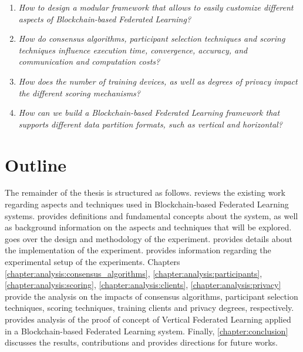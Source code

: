 \begin{enumerate}
    \item \textit{How to design a modular framework that allows to easily customize different aspects of Blockchain-based Federated Learning?}
    
    \item \textit{How do consensus algorithms, participant selection techniques and scoring techniques influence execution time, convergence, accuracy, and communication and computation costs?}
    
    \item \textit{How does the number of training devices, as well as degrees of privacy impact the different scoring mechanisms?}
    
    \item \textit{How can we build a Blockchain-based Federated Learning framework that supports different data partition formats, such as vertical and horizontal?}
\end{enumerate}

\section{Outline}\label{intro:outline}

The remainder of the thesis is structured as follows.  reviews the existing work regarding aspects and techniques used in Blockchain-based Federated Learning systems.  provides definitions and fundamental concepts about the system, as well as background information on the aspects and techniques that will be explored.  goes over the design and methodology of the experiment.  provides details about the implementation of the experiment.  provides information regarding the experimental setup of the experiments. Chapters \ref{chapter:analysis:consensus_algorithms}, \ref{chapter:analysis:participants}, \ref{chapter:analysis:scoring}, \ref{chapter:analysis:clients}, \ref{chapter:analysis:privacy} provide the analysis on the impacts of consensus algorithms, participant selection techniques, scoring techniques, training clients and privacy degrees, respectively.  provides analysis of the proof of concept of Vertical Federated Learning applied in a Blockchain-based Federated Learning system. Finally, \cref{chapter:conclusion} discusses the results, contributions and provides directions for future works.

